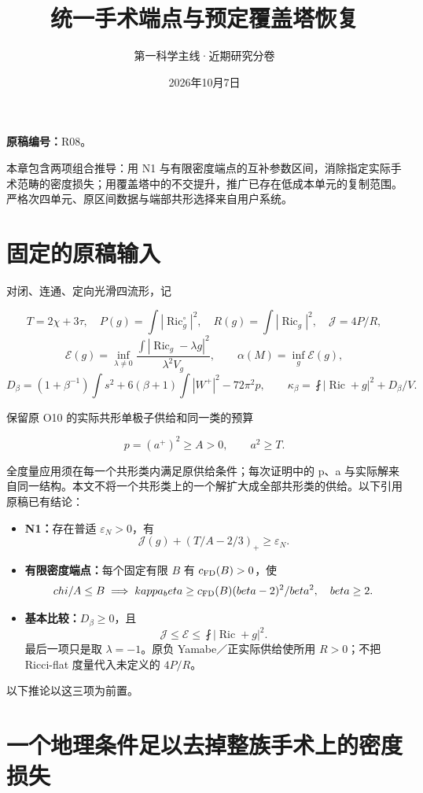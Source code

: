 \documentclass[UTF8,11pt,fontset=none]{ctexart}
\title{统一手术端点与预定覆盖塔恢复}
\author{第一科学主线·近期研究分卷}
\date{2026年10月7日}
\providecommand{\tightlist}{\setlength{\itemsep}{1pt}\setlength{\parskip}{0pt}}
\begin{document}
\maketitle
\noindent\textbf{原稿编号：}R08。

本章包含两项组合推导：用 N1 与有限密度端点的互补参数区间，消除指定实际手术范畴的密度损失；用覆盖塔中的不交提升，推广已存在低成本单元的复制范围。严格次四单元、原区间数据与端部共形选择来自用户系统。\cite{R08,N1,FD,System,Conformal}

\section{固定的原稿输入}\label{ch8:ux56faux5b9aux7684ux539fux7a3fux8f93ux5165}

对闭、连通、定向光滑四流形，记

\[
T=2\chi+3\tau,\quad
P(g)=\int|\operatorname{Ric}^{\circ}_g|^2,\quad
R(g)=\int|\operatorname{Ric}_g|^2,
\quad\mathcal J=4P/R,
\] \[
\mathcal E(g)=\inf_{\lambda\ne0}
\frac{\int|\operatorname{Ric}_g-\lambda g|^2}{\lambda^2V_g},
\qquad \alpha(M)=\inf_g\mathcal E(g),
\] \[
D_\beta=(1+\beta^{-1})\int s^2
+6(\beta+1)\int|W^+|^2-72\pi^2p,
\qquad
\kappa_\beta=\fint|\operatorname{Ric}+g|^2+D_\beta/V.
\]

保留原 O10 的实际共形单极子供给和同一类的预算

\[
p=(a^+)^2\ge A>0,\qquad a^2\ge T.
\]

全度量应用须在每一个共形类内满足原供给条件；每次证明中的 p、a 与实际解来自同一结构。本文不将一个共形类上的一个解扩大成全部共形类的供给。以下引用原稿已有结论：

\begin{itemize}
\tightlist
\item
  \textbf{N1：}存在普适 \(\varepsilon_N>0\)，有 \[
  \mathcal J(g)+(T/A-2/3)_+\ge\varepsilon_N.
  \]
\item
  \textbf{有限密度端点：}每个固定有限 \(B\) 有 \(c_{\rm FD}(B)>0\)，使 \[
  \chi/A\le B\implies
  \kappa_\beta\ge c_{\rm FD}(B)(\beta-2)^2/\beta^2,
  \quad\beta\ge2.
  \]
\item
  \textbf{基本比较：}\(D_\beta\ge0\)，且 \[
  \mathcal J\le\mathcal E\le\fint|\operatorname{Ric}+g|^2.
  \] 最后一项只是取 \(\lambda=-1\)。原负 Yamabe／正实际供给使所用 \(R>0\)；不把 Ricci-flat 度量代入未定义的 \(4P/R\)。
\end{itemize}

以下推论以这三项为前置。

\section{一个地理条件足以去掉整族手术上的密度损失}\label{ch8:ux4e00ux4e2aux5730ux7406ux6761ux4ef6ux8db3ux4ee5ux53bbux6389ux6574ux65cfux624bux672fux4e0aux7684ux5bc6ux5ea6ux635fux5931}
\end{document}

